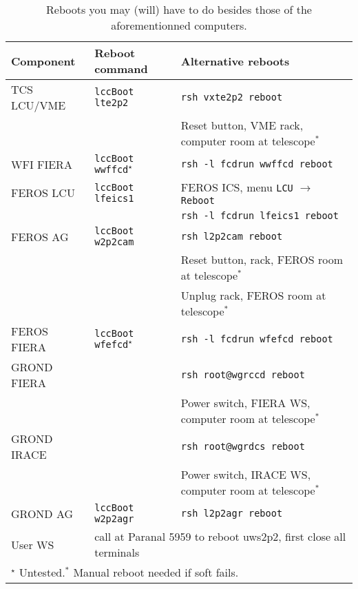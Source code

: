 \documentclass[11pt,fleqn]{book} %
\begin{document}
\begin{table}
\caption[Some useful reboots]{Reboots you may (will) have to do besides those of the aforementionned computers.}
\label{tab:reboots}
\centering
\begin{tabular}{lll}
\hline
Component   & Reboot command                       & Alternative reboots\\
\hline\hline
TCS LCU/VME & \texttt{lccBoot lte2p2}              & \texttt{rsh vxte2p2 reboot}\\ 
            &                                      & Reset button, VME rack, computer room at telescope$^\ast$\\
\hline
WFI FIERA   & \texttt{lccBoot wwffcd}$^\star$      & \texttt{rsh -l fcdrun wwffcd reboot}\\
\hline
FEROS LCU   & \texttt{lccBoot lfeics1}             & FEROS ICS, menu \texttt{LCU} $\rightarrow$ \texttt{Reboot}\\
            &                                      & \texttt{rsh -l fcdrun lfeics1 reboot}\\
FEROS AG    & \texttt{lccBoot w2p2cam}             & \texttt{rsh l2p2cam reboot}\\
            &                                      & Reset button, rack, FEROS room at telescope$^\ast$\\
            &                                      & Unplug rack, FEROS room at telescope$^\ast$\\
FEROS FIERA & \texttt{lccBoot wfefcd}$^\star$      & \texttt{rsh -l fcdrun wfefcd reboot}\\
\hline
GROND FIERA &                                      & \texttt{rsh root@wgrccd reboot}\\
            &                                      & Power switch, FIERA WS, computer room at telescope$^\ast$\\
GROND IRACE &                                      & \texttt{rsh root@wgrdcs reboot}\\
            &                                      & Power switch, IRACE WS, computer room at telescope$^\ast$\\
GROND AG    & \texttt{lccBoot w2p2agr}             & \texttt{rsh l2p2agr reboot}\\
\hline
User WS     & \multicolumn{2}{l}{call at Paranal 5959 to reboot uws2p2, first close all terminals}\\
\hline
\multicolumn{3}{l}{$^\star$ Untested.\quad $^\ast$ Manual reboot needed if soft fails.}\\
\hline
\end{tabular}
\end{table}
\end{document}
